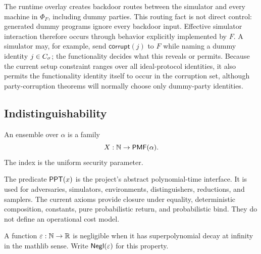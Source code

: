 \begin{remark}
\label{rem:uc-ideal-simulator-access}
The runtime overlay creates backdoor routes between the simulator and every
machine in \(\Phi_F\), including dummy parties.  This routing fact is not direct
control: generated dummy programs ignore every backdoor input.  Effective
simulator interaction therefore occurs through behavior explicitly implemented
by \(F\).  A simulator may, for example, send
\(\mathsf{corrupt}(j)\) to \(F\) while naming a dummy identity
\(j\in C_\sigma\); the functionality decides what this reveals or permits.
Because the current setup constraint ranges over all ideal-protocol identities,
it also permits the functionality identity itself to occur in the corruption
set, although party-corruption theorems will normally choose only dummy-party
identities.
\end{remark}

\subsection{Indistinguishability}

\begin{definition}[Ensembles]
\label{def:uc-ensemble}
\leanok
An ensemble over \(\alpha\) is a family
\[
  X:\mathbb{N}\to\mathsf{PMF}(\alpha).
\]
The index is the uniform security parameter.
\end{definition}

\begin{definition}
\label{def:uc-ppt}
\leanok
The predicate \(\mathsf{PPT}(x)\) is the project's abstract polynomial-time
interface.  It is used for adversaries, simulators, environments,
distinguishers, reductions, and samplers.  The current axioms provide closure
under equality, deterministic composition, constants, pure probabilistic
return, and probabilistic bind.  They do not define an operational cost model. 
\end{definition}

\begin{definition}
\label{def:uc-negligible}
\leanok
A function \(\varepsilon:\mathbb{N}\to\mathbb{R}\) is negligible when it has
superpolynomial decay at infinity in the mathlib sense.  Write
\(\mathsf{Negl}(\varepsilon)\) for this property.
\end{definition}

